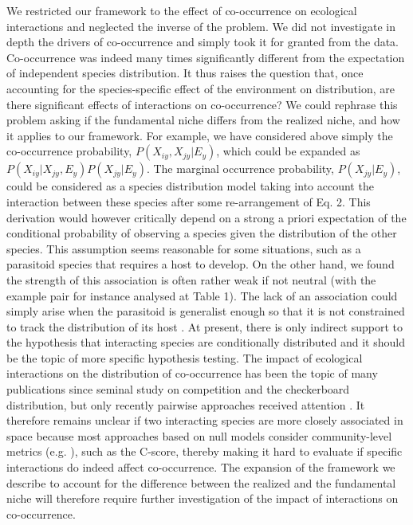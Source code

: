 \documentclass[12pt]{article}
\begin{document}
We restricted our framework to the effect of co-occurrence on ecological
interactions and neglected the inverse of the problem. We did not investigate
in depth the drivers of co-occurrence and simply took it for granted from the
data. Co-occurrence was indeed many times significantly different from the
expectation of independent species distribution. It thus raises the question
that, once accounting for the species-specific effect of the environment on
distribution, are there significant effects of interactions on co-occurrence?
We could rephrase this problem asking if the fundamental niche differs from
the realized niche, and how it applies to our framework. For example, we have
considered above simply the co-occurrence probability, $P(X_{iy},X_{jy}|E_y)$,
which could be expanded as  $P(X_{iy}|X_{jy},E_y) P(X_{jy}| E_y )$. The
marginal occurrence probability, $P(X_{jy}|E_y )$, could be considered as a
species distribution model taking into account the interaction between these
species after some re-arrangement of Eq. 2. This derivation would however
critically depend on a strong a priori expectation of the conditional
probability of observing a species given the distribution of the other
species. This assumption seems reasonable for some situations, such as a
parasitoid species that requires a host to develop. On the other hand, we
found the strength of this association is often rather weak if not neutral
(with the example pair for instance analysed at Table 1). The lack of an
association could simply arise when the parasitoid is generalist enough so
that it is not constrained to track the distribution of its host
\citep{Cazelles2015}. At present, there is only indirect support to the
hypothesis that interacting species are conditionally distributed and it
should be the topic of more specific hypothesis testing. The impact of
ecological interactions on the distribution of co-occurrence has been the
topic of many publications since \citealt{Diamond1975} seminal study on
competition and the checkerboard distribution, but only recently pairwise
approaches received attention \citep{Veech2013}. It therefore remains unclear
if two interacting species are more closely associated in space because most
approaches based on null models consider community-level metrics (e.g.
\citealt{Gotelli2000}), such as the C-score, thereby making it hard to
evaluate if specific interactions do indeed affect co-occurrence. The
expansion of the framework we describe to account for the difference between
the realized and the fundamental niche will therefore require further
investigation of the impact of interactions on co-occurrence.
\end{document}
